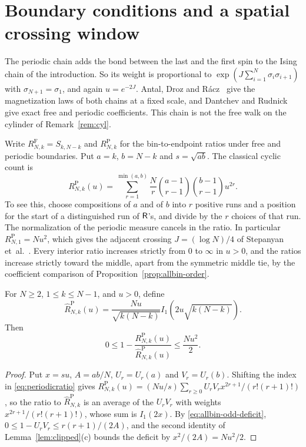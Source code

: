 \section{Boundary conditions and a spatial crossing window}\label{sec:periodicwindow}

The periodic chain adds the bond between the last and the first spin to the
Ising chain of the introduction. So its weight is proportional to
$\exp(J\sum_{i=1}^N\sigma_i\sigma_{i+1})$ with $\sigma_{N+1}=\sigma_1$, and
again $u=e^{-2J}$. Antal, Droz and
R\'acz~\cite{antal2004} give the magnetization laws of both chains at a
fixed scale, and Dantchev and Rudnick~\cite{dantchev2022} give exact free and
periodic coefficients. This chain is not the free walk on the cylinder of
Remark~\ref{rem:cyl}.

Write $R^{\mathrm F}_{N,k}=S_{k,N-k}$ and $R^{\mathrm P}_{N,k}$ for the
bin-to-endpoint ratios under free and periodic boundaries. Put $a=k$, $b=N-k$
and $s=\sqrt{ab}$. The classical cyclic count is
\begin{equation}\label{eq:periodicratio}
R^{\mathrm P}_{N,k}(u)=\sum_{r=1}^{\min(a,b)}\frac Nr
 \binom{a-1}{r-1}\binom{b-1}{r-1}u^{2r}.
\end{equation}
To see this, choose compositions of $a$ and of $b$ into $r$ positive runs and a
position for the start of a distinguished run of $\mathsf R$'s, and divide by the $r$
choices of that run. The normalization of the periodic measure cancels in the
ratio. In particular $R^{\mathrm P}_{N,1}=Nu^2$, which gives the adjacent
crossing $J=(\log N)/4$ of Stepanyan et~al.\@~\cite{stepanyan2024}. Every interior ratio increases strictly from $0$ to
$\infty$ in $u>0$, and the ratios increase strictly toward the middle, apart
from the symmetric middle tie, by the coefficient comparison of
Proposition~\ref{prop:allbin-order}.

\begin{theorem}\label{thm:periodic-bessel}
For $N\ge2$, $1\le k\le N-1$, and $u>0$, define
\[
\widehat R^{\mathrm P}_{N,k}(u)=\frac{Nu}{\sqrt{k(N-k)}}
 I_1\!\left(2u\sqrt{k(N-k)}\right).
\]
Then
\begin{equation}\label{eq:periodicbound}
0\le1-\frac{R^{\mathrm P}_{N,k}(u)}{\widehat R^{\mathrm P}_{N,k}(u)}
\le\frac{Nu^2}{2}.
\end{equation}
\end{theorem}
\begin{proof}
Put $x=su$, $A=ab/N$, $U_r=U_r(a)$ and $V_r=U_r(b)$. Shifting the index in
\eqref{eq:periodicratio} gives
$R^{\mathrm P}_{N,k}(u)=(Nu/s)\sum_{r\ge0}U_rV_rx^{2r+1}/(r!(r+1)!)$, so the
ratio to $\widehat R^{\mathrm P}_{N,k}$ is an average of the $U_rV_r$ with
weights $x^{2r+1}/(r!(r+1)!)$, whose sum is $I_1(2x)$. By
\eqref{eq:allbin-odd-deficit}, $0\le1-U_rV_r\le r(r+1)/(2A)$, and the second
identity of Lemma~\ref{lem:clipped}(c) bounds the deficit by $x^2/(2A)=Nu^2/2$.
\end{proof}

